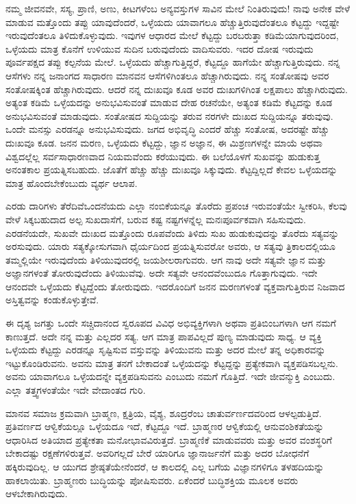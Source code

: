 ನಮ್ಮ ಜೀವನವೇ, ಸಸ್ಯ, ಪ್ರಾಣಿ, ಅಣು, ಕೀಟಗಳೆಂಬ ಅನ್ಯವಸ್ತುಗಳ ಸಾವಿನ ಮೇಲೆ ನಿಂತಿರುವುದು! ನಾವು ಅನೇಕ ವೇಳೆ ಮಾಡುವ ಮತ್ತೊಂದು ತಪ್ಪು ಯಾವುದೆಂದರೆ, ಒಳ್ಳೆಯದು ಯಾವಾಗಲೂ ಹೆಚ್ಚುತ್ತಿರುವುದೆಂತಲೂ ಕೆಟ್ಟದ್ದು ಇದ್ದಷ್ಟೇ ಇರುವುದೆಂತಲೂ ತಿಳಿದುಕೊಳ್ಳುವುದು. ಇವುಗಳ ಆಧಾರದ ಮೇಲೆ ಕೆಟ್ಟದ್ದು ಬರಬರುತ್ತಾ ಕಡಿಮೆಯಾಗುವುದರಿಂದ, ಒಳ್ಳೆಯದು ಮಾತ್ರ ಕೊನೆಗೆ ಉಳಿಯುವ ಸುದಿನ ಬರುವುದೆಂದು ವಾದಿಸುವರು. ಇದರ ದೋಷ ಇರುವುದು ಪೂರ್ವಪಕ್ಷದ ತಪ್ಪು ಕಲ್ಪನೆಯ ಮೇಲೆ. ಒಳ್ಳೆಯದು ಹೆಚ್ಚಾಗುತ್ತಿದ್ದರೆ, ಕೆಟ್ಟದ್ದೂ ಹಾಗೆಯೇ ಹೆಚ್ಚಾಗುತ್ತಿರುವುದು. ನನ್ನ ಆಸೆಗಳು ನನ್ನ ಜನಾಂಗದ ಸಾಧಾರಣ ಮಾನವನ ಆಸೆಗಳಿಗಿಂತಲೂ ಹೆಚ್ಚಾಗಿರುವುದು. ನನ್ನ ಸಂತೋಷವು ಅವರ ಸಂತೋಷಕ್ಕಿಂತ ಹೆಚ್ಚಾಗಿರುವುದು. ಆದರೆ ನನ್ನ ದುಃಖವೂ ಕೂಡ ಅವರ ದುಃಖಗಳಿಗಿಂತ ಲಕ್ಷಪಾಲು ಹೆಚ್ಚಾಗಿರುವುದು. ಅತ್ಯಂತ ಕಡಿಮೆ ಒಳ್ಳೆಯದನ್ನು ಅನುಭವಿಸುವಂತೆ ಮಾಡುವ ದೇಹ ರಚನೆಯೇ, ಅತ್ಯಂತ ಕಡಿಮೆ ಕೆಟ್ಟದನ್ನು ಕೂಡ ಅನುಭವಿಸುವಂತೆ ಮಾಡುವುದು. ಸಂತೋಷದ ಸುದ್ದಿಯನ್ನು ತರುವ ನರಗಳೇ ದುಃಖದ ಸುದ್ದಿಯನ್ನೂ ತರುವುವು. ಒಂದೇ ಮನಸ್ಸು ಎರಡನ್ನೂ ಅನುಭವಿಸುವುದು. ಜಗದ ಅಭಿವೃದ್ಧಿ ಎಂದರೆ ಹೆಚ್ಚು ಸಂತೋಷ, ಅದರಷ್ಟೇ ಹೆಚ್ಚು ದುಃಖವೂ ಕೂಡ. ಜನನ ಮರಣ, ಒಳ್ಳೆಯದು ಕೆಟ್ಟದ್ದು, ಜ್ಞಾನ ಅಜ್ಞಾನ, ಈ ಮಿಶ್ರಣಗಳನ್ನೇ ಮಾಯೆ ಅಥವಾ ವಿಶ್ವದಲ್ಲೆಲ್ಲ ಸರ್ವಸಾಧಾರಣವಾದ ನಿಯಮವೆಂದು ಕರೆಯುವುದು. ಈ ಬಲೆಯೊಳಗೆ ಸುಖವನ್ನು ಹುಡುಕುತ್ತ ಅನಂತಕಾಲ ಪ್ರಯತ್ನಿಸಬಹುದು. ಜೊತೆಗೆ ಹೆಚ್ಚು ಹೆಚ್ಚು ದುಃಖವೂ ಸಿಕ್ಕುವುದು. ಕೆಟ್ಟದ್ದಿಲ್ಲದೆ ಕೇವಲ ಒಳ್ಳೆಯದನ್ನು ಮಾತ್ರ ಹೊಂದಬೇಕೆಂಬುದು ವ್ಯರ್ಥ ಆಲಾಪ.

ಎರಡು ದಾರಿಗಳು ತೆರೆದಿವೆ\enginline{-}ಒಂದನೆಯದು ಎಲ್ಲಾ ನಂಬಿಕೆಯನ್ನೂ ತೊರೆದು ಪ್ರಪಂಚ ಇರುವಂತೆಯೇ ಸ್ವೀಕರಿಸಿ, ಕೆಲವು ವೇಳೆ ಸಿಕ್ಕಬಹುದಾದ ಅಲ್ಪ ಸುಖದಾಸೆಗೆ, ಬರುವ ಕಷ್ಟ ನಷ್ಟಗಳನ್ನೆಲ್ಲ ಮನಃಪೂರ್ವಕವಾಗಿ ಸಹಿಸುವುದು. ಎರಡನೆಯದೇ, ಸುಖವೇ ದುಃಖದ ಮತ್ತೊಂದು ರೂಪವೆಂದು ತಿಳಿದು ಸುಖ ಹುಡುಕುವುದನ್ನು ತೊರೆದು ಸತ್ಯವನ್ನು ಅರಸುವುದು. ಯಾರು ಸತ್ಯಕ್ಕೋಸುಗವಾಗಿ ಧೈರ್ಯದಿಂದ ಪ್ರಯತ್ನಿಸುವರೋ ಅವರು, ಆ ಸತ್ಯವು ತ್ರಿಕಾಲದಲ್ಲಿಯೂ ತಮ್ಮಲ್ಲಿಯೇ ಇರುವುದೆಂದು ತಿಳಿಯುವುದರಲ್ಲಿ ಜಯಶೀಲರಾಗುವರು. ಆಗ ನಾವು ಅದೇ ಸತ್ಯವೇ ಜ್ಞಾನ ಮತ್ತು ಅಜ್ಞಾನಗಳಂತೆ ತೋರುವುದೆಂದು ತಿಳಿಯುವೆವು. ಅದೇ ಸತ್ಯವೇ ಆನಂದವೆಂಬುದೂ ಗೊತ್ತಾಗುವುದು. ಇದೇ ಆನಂದವೇ ಒಳ್ಳೆಯದು ಕೆಟ್ಟದ್ದೆಂದು ತೋರುವುದು. ಇದರೊಂದಿಗೆ ಜನನ ಮರಣಗಳಂತೆ ವ್ಯಕ್ತವಾಗು\break ತ್ತಿರುವ ನಿಜವಾದ ಅಸ್ತಿತ್ವವನ್ನು ಕಂಡುಕೊಳ್ಳುತ್ತೇವೆ.

ಈ ದೃಶ್ಯ ಜಗತ್ತು ಒಂದೇ ಸಚ್ಚಿದಾನಂದ ಸ್ವರೂಪದ ವಿವಿಧ ಅಭಿವ್ಯಕ್ತಿಗಳಾಗಿ ಅಥವಾ ಪ್ರತಿಬಿಂಬಗಳಾಗಿ ಆಗ ನಮಗೆ ಕಾಣುತ್ತದೆ. ಅದೇ ನನ್ನ ಮತ್ತು ಎಲ್ಲದರ ಸತ್ಯ. ಆಗ ಮಾತ್ರ ಪಾಪವಿಲ್ಲದೆ ಪುಣ್ಯ ಮಾಡುವುದು ಸಾಧ್ಯ. ಆ ವ್ಯಕ್ತಿ ಒಳ್ಳೆಯದು ಕೆಟ್ಟದ್ದು ಎರಡನ್ನೂ ಸೃಷ್ಟಿಸುವ ವಸ್ತುವನ್ನು ತಿಳಿಯುವನು ಮತ್ತು ಅದರ ಮೇಲೆ ತನ್ನ ಅಧಿಕಾರವನ್ನು ಇಟ್ಟುಕೊಂಡಿರುವನು. ಅವನು ಮಾತ್ರ ತನಗೆ ಬೇಕಾದಂತೆ ಒಳ್ಳೆಯದನ್ನು ಕೆಟ್ಟದ್ದನ್ನು ಪ್ರತ್ಯೇಕವಾಗಿ ವ್ಯಕ್ತಪಡಿಸಬಲ್ಲನು. ಅವನು ಯಾವಾಗಲೂ ಒಳ್ಳೆಯದನ್ನೇ ವ್ಯಕ್ತಪಡಿಸುವನು ಎಂಬುದು ನಮಗೆ ಗೊತ್ತಿದೆ. ಇದೇ ಜೀವನ್ಮುಕ್ತಿ ಎಂಬುದು. ಎಲ್ಲಾ ತತ್ತ್ವಗಳಂತೆಯೇ ಇದೇ ವೇದಾಂತದ ಗುರಿ.

ಮಾನವ ಸಮಾಜ ಕ್ರಮವಾಗಿ ಬ್ರಾಹ್ಮಣ, ಕ್ಷತ್ರಿಯ, ವೈಶ್ಯ, ಶೂದ್ರರೆಂಬ ಚಾತುರ್ವರ್ಣದವರಿಂದ ಆಳಲ್ಪಡುತ್ತಿದೆ. ಪ್ರತಿವರ್ಣದ ಆಳ್ವಿಕೆಯಲ್ಲೂ ಒಳ್ಳೆಯದೂ ಇದೆ, ಕೆಟ್ಟದ್ದೂ ಇದೆ. ಬ್ರಾಹ್ಮಣರ ಆಳ್ವಿಕೆಯಲ್ಲಿ ಆನುವಂಶಿಕತೆಯನ್ನು ಆಧಾರಿಸಿದ ಅತಿಯಾದ ಪ್ರತ್ಯೇಕತಾ ಮನೋಭಾವವಿರುತ್ತದೆ. ಬ್ರಾಹ್ಮಣಿಕೆ ಮಾಡುವವರು ಮತ್ತು ಅವರ ವಂಶಸ್ಥರಿಗೆ ಬೇಕಾದಷ್ಟು ರಕ್ಷಣೆಗಳಿರುತ್ತವೆ. ಅವರಿಗಲ್ಲದೆ ಬೇರೆ ಯಾರಿಗೂ ಜ್ಞಾನಾರ್ಜನೆಗೆ ಮತ್ತು ಅದರ ಬೋಧನೆಗೆ ಹಕ್ಕಿರುವುದಿಲ್ಲ. ಆ ಯುಗದ ಶ್ರೇಷ್ಠತೆಯೇನೆಂದರೆ, ಆ ಕಾಲದಲ್ಲಿ ಎಲ್ಲ ಬಗೆಯ ವಿಜ್ಞಾನಗಳಿಗೂ ತಳಹದಿಯನ್ನು ಹಾಕಲಾಯಿತು. ಬ್ರಾಹ್ಮಣರು ಬುದ್ಧಿಯನ್ನು ಪೋಷಿಸುವರು. ಏಕೆಂದರೆ ಬುದ್ಧಿಶಕ್ತಿಯ ಮೂಲಕ ಅವರು ಆಳಬೇಕಾಗಿರುವುದು.

